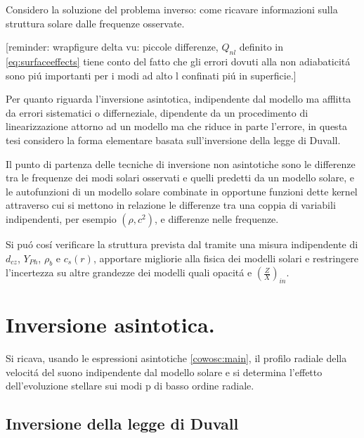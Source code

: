 \documentclass[../main.tex]{subfiles}
\begin{document}
Considero la soluzione del problema inverso: come ricavare informazioni sulla struttura solare dalle frequenze osservate.

[reminder: wrapfigure delta vu: piccole differenze, $Q_{nl}$ definito in \eqref{eq:surfaceeffects} tiene conto del fatto che gli errori dovuti alla non adiabaticit\'a sono pi\'u importanti per i modi ad alto l confinati pi\'u in superficie.]

Per quanto riguarda l'inversione asintotica, indipendente dal modello ma afflitta da errori sistematici o differneziale, dipendente da un procedimento di linearizzazione attorno ad un modello ma che riduce in parte l'errore, in questa tesi considero la forma elementare basata sull'inversione della legge di Duvall.

Il punto di partenza delle tecniche di inversione non asintotiche sono le  differenze tra le frequenze dei modi solari osservati e quelli predetti da un modello solare, e le autofunzioni di un modello solare combinate in opportune funzioni dette kernel attraverso cui si mettono in relazione le differenze tra una coppia di variabili indipendenti, per esempio $(\rho,c^2)$, e differenze nelle frequenze.

Si pu\'o cos\'i verificare la struttura prevista dal \mss{} tramite una misura indipendente di $d_{cz}$, $Y_{Ph}$, $\rho_b$ e $c_s(r)$, apportare migliorie alla fisica dei modelli solari e restringere l'incertezza su altre grandezze dei modelli quali opacit\'a e $(\frac{Z}{X})_{in}$.


{\let\clearpage\relax\let\cleardoublepage\relax \chapter{Inversione asintotica.}} %


Si ricava, usando le espressioni asintotiche \eqref{cowosc:main}, il profilo radiale della velocit\'a del suono indipendente dal modello solare e si determina l'effetto dell'evoluzione stellare sui modi p di basso ordine radiale.

\section{Inversione della legge di Duvall}
\end{document}
